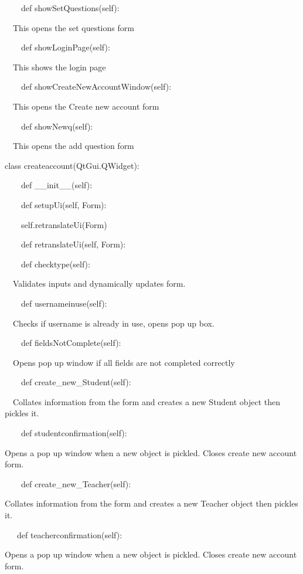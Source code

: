 \documentclass{article}
\begin{document}
\ \ \ \ def showSetQuestions(self):

\ \ This opens the set questions form

\ \ \ \ def showLoginPage(self):

\ \ This shows the login page

\ \ \ \ def showCreateNewAccountWindow(self):

\ \ This opens the Create new account form

\ \ \ \ def showNewq(self):

\ \ This opens the add question form


\bigskip

class createaccount(QtGui.QWidget):

\ \ \ \ def \_\_init\_\_(self):

\ \ \ \ def setupUi(self, Form):

\ \ \ \ self.retranslateUi(Form)

\ \ \ \ def retranslateUi(self, Form):

\ \ \ \ def checktype(self):

\ \ Validates inputs and dynamically updates form.

\ \ \ \ def usernameinuse(self):

\ \ Checks if username is already in use, opens pop up box.

\ \ \ \ def fieldsNotComplete(self):

\ \ Opens pop up window if all fields are not completed correctly

\ \ \ \ def create\_new\_Student(self):

\ \ Collates information from the form and creates a new Student object then pickles it.


\bigskip

\ \ \ \ def studentconfirmation(self):

Opens a pop up window when a new object is pickled. Closes create new account form.

\ \ \ \ def create\_new\_Teacher(self):

Collates information from the form and creates a new Teacher object then pickles it.

\ \ \ def teacherconfirmation(self):

Opens a pop up window when a new object is pickled. Closes create new account form.
\end{document}
